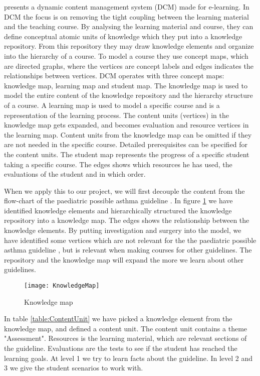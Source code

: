 \textcite{Eide2008} presents a dynamic content management system (DCM) made for e-learning. In DCM the focus is on removing the tight coupling between the learning material and the teaching course. By analysing the learning material and course, they can define conceptual atomic units of knowledge which they put into a knowledge repository. From this repository they may draw knowledge elements and organize into the hierarchy of a course. To model a course they use concept maps, which are directed graphs, where the vertices are concept labels and edges indicates the relationships between vertices. DCM operates with three concept maps: knowledge map, learning map and student map. The knowledge map is used to model the entire content of the knowledge repository and the hierarchy structure of a course. A learning map is used to model a specific course and is a representation of the learning process. The content units (vertices) in the knowledge map gets expanded, and becomes evaluation and resource vertices in the learning map. Content units from the knowledge map can be omitted if they are not needed in the specific course. Detailed prerequisites can be specified for the content units. The student map represents the progress of a specific student taking a specific course. The edges shows which resources he has used, the evaluations of the student and in which order. 


When we apply this to our project, we will first decouple the content from the flow-chart of the paediatric possible asthma guideline \parencite{RepublicofKeny2016}. In figure \ref{fig:KnowledgeMap} we have identified knowledge elements and hierarchically structured the knowledge repository into a knowledge map. The edges shows the relationship between the knowledge elements. By putting investigation and surgery into the model, we have identified some vertices which are not relevant for the the paediatric possible asthma guideline \parencite{RepublicofKeny2016}, but is relevant when making courses for other guidelines. The repository and the knowledge map will expand the more we learn about other guidelines.

\begin{figure}[h!]
	\caption {Knowledge map}
	\label{fig:KnowledgeMap}
	\texttt{[image: KnowledgeMap]}
\end{figure}

In table \ref{table:ContentUnit} we have picked a knowledge element from the knowledge map, and defined a content unit. The content unit contains a theme "Assessment". Resources is the learning material, which are relevant sections of the guideline. Evaluations are the tests to see if the student has reached the learning goals. At level 1 we try to learn facts about the guideline. In level 2 and 3 we give the student scenarios to work with.

